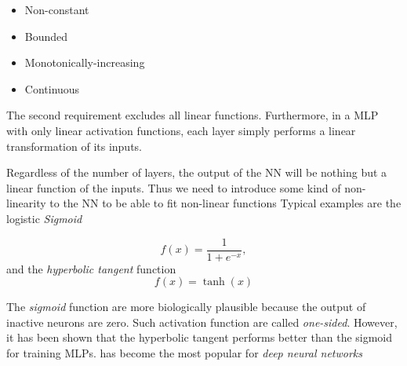 \begin{itemize}
  \item Non-constant

  \item Bounded

  \item Monotonically-increasing

  \item Continuous
\end{itemize}

\noindent
The second requirement excludes all linear functions. Furthermore, in
a MLP with only linear activation functions, each layer simply
performs a linear transformation of its inputs.

Regardless of the number of layers, the output of the NN will be
nothing but a linear function of the inputs. Thus we need to introduce
some kind of non-linearity to the NN to be able to fit non-linear
functions Typical examples are the logistic \emph{Sigmoid}

\[
 f(x) = \frac{1}{1 + e^{-x}},
\]
and the \emph{hyperbolic tangent} function
\[
 f(x) = \tanh(x)
\]

The \emph{sigmoid} function are more biologically plausible because the
output of inactive neurons are zero. Such activation function are
called \emph{one-sided}. However, it has been shown that the hyperbolic
tangent performs better than the sigmoid for training MLPs.  has
become the most popular for \emph{deep neural networks}









































































